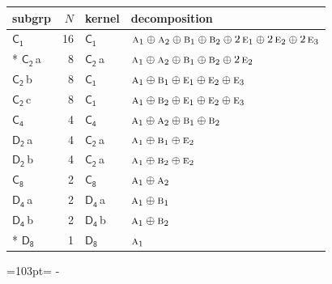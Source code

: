 \documentclass[10pt,a4paper]{article}
\newcommand{\needspace}[1]{\par\penalty-100\begingroup\dimen0=#1\relax\dimen2=\pagegoal
  \advance\dimen2-\pagetotal\ifdim\dimen0>\dimen2\relax\ifdim\dimen2>0pt\vfil\break\fi\fi
  \endgroup}
\numberwithin{equation}{section}
\newcommand{\grp}[1]{\mathsf{#1}}
\newcommand{\irr}[1]{\text{\normalfont\scshape #1}}
\newcommand{\clsletter}[1]{\,{\scriptsize\color{black!55}#1}}
\newlength{\fillwidth}\newlength{\cellwidth}\newlength{\colwidth}
\begin{document}
{\begin{longtable}{@{}lrl>{\RaggedRight\arraybackslash}p{\fillwidth}@{}}
subgrp & $N$ & kernel & decomposition\\\midrule\endhead
\bottomrule\endfoot\endlastfoot
\href{C1.pdf}{$\grp{C_{1}}$} & 16 & \href{C1.pdf}{$\grp{C_{1}}$} & $\irr{a}_{1}\oplus \irr{a}_{2}\oplus \irr{b}_{1}\oplus \irr{b}_{2}\oplus 2\,\irr{e}_{1}\oplus 2\,\irr{e}_{2}\oplus 2\,\irr{e}_{3}$\\*
\href{C2.pdf}{$\grp{C_{2}}$}\clsletter{a} & 8 & \href{C2.pdf}{$\grp{C_{2}}$}\clsletter{a} & $\irr{a}_{1}\oplus \irr{a}_{2}\oplus \irr{b}_{1}\oplus \irr{b}_{2}\oplus 2\,\irr{e}_{2}$\\
\href{C2.pdf}{$\grp{C_{2}}$}\clsletter{b} & 8 & \href{C1.pdf}{$\grp{C_{1}}$} & $\irr{a}_{1}\oplus \irr{b}_{1}\oplus \irr{e}_{1}\oplus \irr{e}_{2}\oplus \irr{e}_{3}$\\
\href{C2.pdf}{$\grp{C_{2}}$}\clsletter{c} & 8 & \href{C1.pdf}{$\grp{C_{1}}$} & $\irr{a}_{1}\oplus \irr{b}_{2}\oplus \irr{e}_{1}\oplus \irr{e}_{2}\oplus \irr{e}_{3}$\\
\href{C4.pdf}{$\grp{C_{4}}$} & 4 & \href{C4.pdf}{$\grp{C_{4}}$} & $\irr{a}_{1}\oplus \irr{a}_{2}\oplus \irr{b}_{1}\oplus \irr{b}_{2}$\\
\href{D2.pdf}{$\grp{D_{2}}$}\clsletter{a} & 4 & \href{C2.pdf}{$\grp{C_{2}}$}\clsletter{a} & $\irr{a}_{1}\oplus \irr{b}_{1}\oplus \irr{e}_{2}$\\
\href{D2.pdf}{$\grp{D_{2}}$}\clsletter{b} & 4 & \href{C2.pdf}{$\grp{C_{2}}$}\clsletter{a} & $\irr{a}_{1}\oplus \irr{b}_{2}\oplus \irr{e}_{2}$\\
\href{C8.pdf}{$\grp{C_{8}}$} & 2 & \href{C8.pdf}{$\grp{C_{8}}$} & $\irr{a}_{1}\oplus \irr{a}_{2}$\\
\href{D4.pdf}{$\grp{D_{4}}$}\clsletter{a} & 2 & \href{D4.pdf}{$\grp{D_{4}}$}\clsletter{a} & $\irr{a}_{1}\oplus \irr{b}_{1}$\\
\href{D4.pdf}{$\grp{D_{4}}$}\clsletter{b} & 2 & \href{D4.pdf}{$\grp{D_{4}}$}\clsletter{b} & $\irr{a}_{1}\oplus \irr{b}_{2}$\\*
\href{D8.pdf}{$\grp{D_{8}}$} & 1 & \href{D8.pdf}{$\grp{D_{8}}$} & $\irr{a}_{1}$\\
\bottomrule\end{longtable}}
\needspace{103pt}
\end{document}
